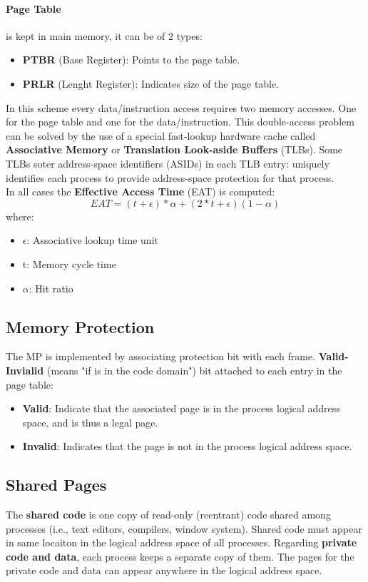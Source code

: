 \documentclass[12pt]{article}
\begin{document}
\paragraph{Page Table} is kept in main memory, it can be of 2 types:
\begin{itemize}
  \item \textbf{PTBR} (Base Register): Points to the page table.
  \item \textbf{PRLR} (Lenght Register): Indicates size of the page table.
\end{itemize}
In this scheme every data/instruction access requires two memory accesses. One for the page table and one for the data/instruction. This double-access problem can be solved by the use of a special fast-lookup hardware cache called \textbf{Associative Memory} or \textbf{Translation Look-aside Buffers} (TLBs). Some TLBs soter address-space identifiers (ASIDs) in each TLB entry: uniquely identifies each process to provide address-space protection for that process.\\
In all cases the \textbf{Effective Access Time} (EAT) is computed:
\begin{equation} \label{eat}
  EAT = (t + \epsilon)*\alpha + (2*t + \epsilon)(1 - \alpha)
\end{equation}
where:
\begin{itemize}
  \item $\epsilon$: Associative lookup time unit
  \item t: Memory cycle time
  \item $\alpha$: Hit ratio
\end{itemize}

\subsection{Memory Protection}
The MP is implemented by associating protection bit with each frame. \textbf{Valid-Invialid} (means "if is in the code domain") bit attached to each entry in the page table:
\begin{itemize}
  \item \textbf{Valid}: Indicate that the associated page is in the process logical address space, and is thus a legal page.
  \item \textbf{Invalid}: Indicates that the page is not in the process logical address space.
\end{itemize}

\subsection{Shared Pages}
The \textbf{shared code} is one copy of read-only (reentrant) code shared among processes (i.e., text editors, compilers, window system). Shared code must appear in same locaiton in the logical address space of all processes. Regarding \textbf{private code and data}, each process keeps a separate copy of them. The pages for the private code and data can appear anywhere in the logical address space.
\end{document}
